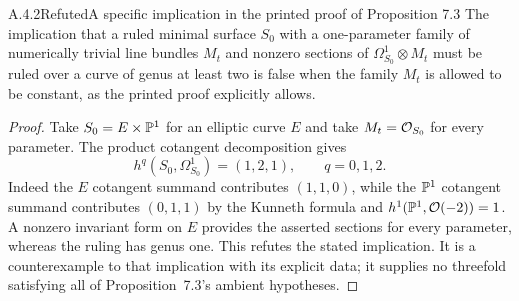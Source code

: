 \begin{statement}{A.4.2}{Refuted}{A specific implication in the printed proof of Proposition 7.3}
The implication that a ruled minimal surface $S_0$ with a one-parameter family of numerically trivial line bundles $M_t$ and nonzero sections of $\Omega^1_{S_0}\otimes M_t$ must be ruled over a curve of genus at least two is false when the family $M_t$ is allowed to be constant, as the printed proof explicitly allows.
\end{statement}
\begin{proof}
Take $S_0=E\times\mathbb P^1$ for an elliptic curve $E$ and take $M_t=\mathcal O_{S_0}$ for every parameter. The product cotangent decomposition gives
\[
 h^q(S_0,\Omega^1_{S_0})=(1,2,1),\qquad q=0,1,2.
\]
Indeed the $E$ cotangent summand contributes $(1,1,0)$, while the $\mathbb P^1$ cotangent summand contributes $(0,1,1)$ by the Kunneth formula and $h^1(\mathbb P^1,\mathcal O(-2))=1$. A nonzero invariant form on $E$ provides the asserted sections for every parameter, whereas the ruling has genus one. This refutes the stated implication. It is a counterexample to that implication with its explicit data; it supplies no threefold satisfying all of Proposition~7.3's ambient hypotheses.
\end{proof}



